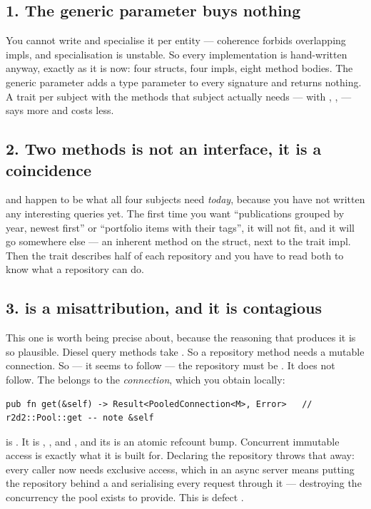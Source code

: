 \subsection*{1. The generic parameter buys nothing}

You cannot write  and specialise it per entity ---
coherence forbids overlapping impls, and specialisation is unstable. So every implementation is
hand-written anyway, exactly as it is now: four structs, four impls, eight method bodies. The
generic parameter adds a type parameter to every signature and returns nothing. A trait per subject
with the methods that subject actually needs ---  with
, ,  --- says more and costs less.

\subsection*{2. Two methods is not an interface, it is a coincidence}

 and  happen to be what all four subjects need \emph{today},
because you have not written any interesting queries yet. The first time you want
``publications grouped by year, newest first'' or ``portfolio items with their tags'', it will not
fit, and it will go somewhere else --- an inherent method on the struct, next to the trait impl.
Then the trait describes half of each repository and you have to read both to know what a
repository can do.

\subsection*{3.  is a misattribution, and it is contagious}

This one is worth being precise about, because the reasoning that produces it is so plausible.
Diesel query methods take . So a repository method needs a mutable connection. So
--- it seems to follow --- the repository must be . It does not follow. The
 belongs to the \emph{connection}, which you obtain locally:

\begin{lstlisting}[style=rs]
pub fn get(&self) -> Result<PooledConnection<M>, Error>   // r2d2::Pool::get -- note &self
\end{lstlisting}

 is . It is ,
, and , and its  is an atomic refcount bump. Concurrent
immutable access is exactly what it is built for. Declaring the repository 
throws that away: every caller now needs exclusive access, which in an async server means putting
the repository behind a  and serialising every request through it --- destroying the
concurrency the pool exists to provide. This is defect .

